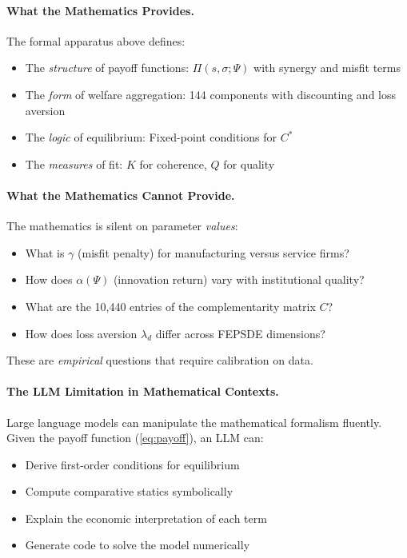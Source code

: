 \paragraph{What the Mathematics Provides.}
The formal apparatus above defines:
\begin{itemize}
    \item The \emph{structure} of payoff functions: $\Pi(s, \sigma; \Psi)$ with synergy and misfit terms
    \item The \emph{form} of welfare aggregation: 144 components with discounting and loss aversion
    \item The \emph{logic} of equilibrium: Fixed-point conditions for $C^*$
    \item The \emph{measures} of fit: $K$ for coherence, $Q$ for quality
\end{itemize}

\paragraph{What the Mathematics Cannot Provide.}
The mathematics is silent on parameter \emph{values}:
\begin{itemize}
    \item What is $\gamma$ (misfit penalty) for manufacturing versus service firms?
    \item How does $\alpha(\Psi)$ (innovation return) vary with institutional quality?
    \item What are the 10,440 entries of the complementarity matrix $C$?
    \item How does loss aversion $\lambda_d$ differ across FEPSDE dimensions?
\end{itemize}

These are \emph{empirical} questions that require calibration on data.

\paragraph{The LLM Limitation in Mathematical Contexts.}
Large language models can manipulate the mathematical formalism fluently.
Given the payoff function (\ref{eq:payoff}), an LLM can:
\begin{itemize}
    \item Derive first-order conditions for equilibrium
    \item Compute comparative statics symbolically
    \item Explain the economic interpretation of each term
    \item Generate code to solve the model numerically
\end{itemize}


